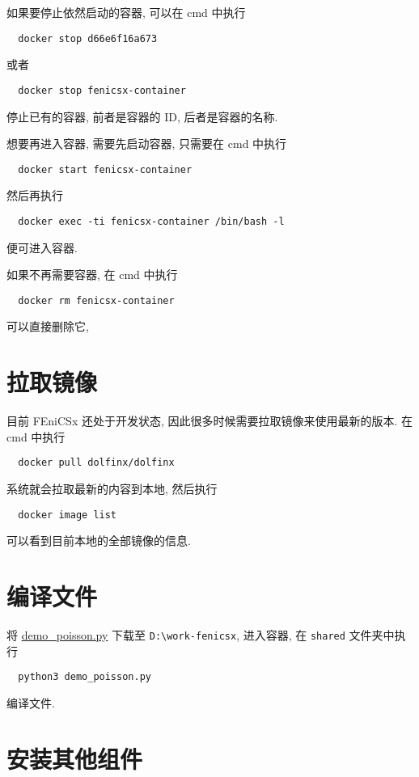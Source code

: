 \documentclass[fontset=founder]{ctexrep}
\begin{document}
如果要停止依然启动的容器,
可以在 \textsf{cmd} 中执行
\begin{lstlisting}
  docker stop d66e6f16a673
\end{lstlisting}
或者
\begin{lstlisting}
  docker stop fenicsx-container
\end{lstlisting}
停止已有的容器,
前者是容器的 ID,
后者是容器的名称.

想要再进入容器,
需要先启动容器,
只需要在 \textsf{cmd} 中执行
\begin{lstlisting}
  docker start fenicsx-container
\end{lstlisting}
然后再执行
\begin{lstlisting}
  docker exec -ti fenicsx-container /bin/bash -l
\end{lstlisting}
便可进入容器.

如果不再需要容器,
在 \textsf{cmd} 中执行
\begin{lstlisting}
  docker rm fenicsx-container
\end{lstlisting}
可以直接删除它,

\section{拉取镜像}

目前 FEniCSx 还处于开发状态,
因此很多时候需要拉取镜像来使用最新的版本.
在 \textsf{cmd} 中执行
\begin{lstlisting}
  docker pull dolfinx/dolfinx
\end{lstlisting}
系统就会拉取最新的内容到本地,
然后执行
\begin{lstlisting}
  docker image list
\end{lstlisting}
可以看到目前本地的全部镜像的信息.

\section{编译文件}

将 \href{https://docs.fenicsproject.org/dolfinx/main/python/_downloads/b94ac7be61dc3726ca331afd20f195d2/demo_poisson.py}{demo\_poisson.py} 下载至 \texttt{D:\textbackslash work-fenicsx},
进入容器,
在 \texttt{shared} 文件夹中执行
\begin{lstlisting}
  python3 demo_poisson.py
\end{lstlisting}
编译文件.

\section{安装其他组件}
\end{document}
